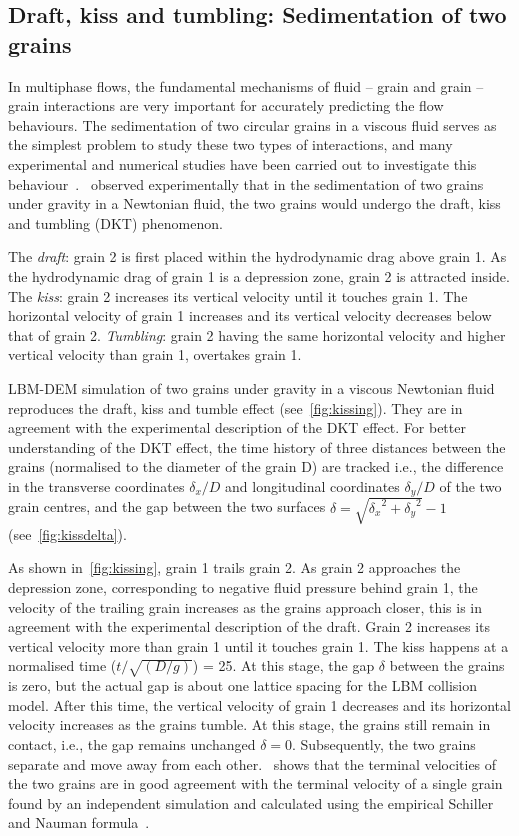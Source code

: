 \subsection{Draft, kiss and tumbling: Sedimentation of two grains}

In multiphase flows, the fundamental mechanisms of fluid -- grain and grain – 
grain interactions are very important for accurately predicting the flow 
behaviours. The sedimentation of two circular grains in a viscous fluid serves 
as the simplest problem to study these two types of interactions, and many 
experimental and numerical studies have been carried out to investigate this 
behaviour~\citep{Wang2014,Komiwes2005}.~\citet{Fortes1987} observed 
experimentally that in the sedimentation of two grains under gravity in a 
Newtonian fluid, the two grains would undergo the draft, kiss and tumbling 
(DKT) phenomenon.

The \emph{draft}: grain 2 is first placed within the hydrodynamic drag above 
grain 1. As the hydrodynamic drag of grain 1 is a depression zone, 
grain 2 is attracted inside. The \emph{kiss}: grain 2 increases its 
vertical velocity until it touches grain 1. The horizontal velocity of 
grain 1 increases and its vertical velocity decreases below that of 
grain 2. \emph{Tumbling}: grain 2 having the same horizontal velocity and 
higher vertical velocity than grain 1, overtakes grain 1.
%

LBM-DEM simulation of two grains under gravity in a viscous Newtonian fluid 
reproduces the draft, kiss and tumble effect (see~\cref{fig:kissing}). They 
are in agreement with the experimental description of the DKT effect. For 
better understanding of the DKT effect, the time history of three distances 
between the grains (normalised to the diameter of the grain D) are tracked 
i.e., the difference in the transverse coordinates $\delta_x/D$ and 
longitudinal coordinates $\delta_y/D$ of the two grain centres, and the gap 
between the two surfaces $\delta = \sqrt{{\delta_x}^2+{\delta_y}^2} - 1 $ 
(see~\cref{fig:kissdelta}). 

As shown in~\cref{fig:kissing}, grain 1 trails grain 2. As grain 2 approaches 
the depression zone, corresponding to negative fluid pressure behind grain 1, 
the velocity of the trailing grain increases as the grains approach closer, 
this is in agreement with the experimental description of the draft. Grain 2 
increases its vertical velocity more than grain 1 until it touches grain 1. The 
kiss happens at a normalised time ($t/\sqrt{(D/g)}$)  = 25. At this stage, the 
gap $\delta$ between the grains is zero, but the actual gap is about one 
lattice spacing for the LBM collision model. After this time, the vertical 
velocity of grain 1 decreases and its horizontal velocity increases as the 
grains tumble. At this stage, the grains still remain in contact, i.e., the gap 
remains unchanged $\delta=0$. Subsequently, the two grains separate and move 
away from each other.~ shows that the terminal 
velocities of the two grains are in good agreement with the terminal velocity 
of a single grain found by an independent simulation and calculated using the 
empirical Schiller and Nauman formula~\citep{Komiwes2005}.

